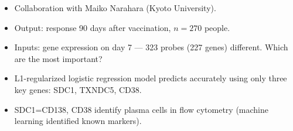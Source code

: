\documentclass{beamer}
\begin{document}
\begin{frame}
{  }

\begin{itemize}
\item Collaboration with Maiko Narahara (Kyoto University).
\item Output: response 90 days after vaccination, $n=270$ people.
\item Inputs: gene expression on day 7 --- 323 probes (227 genes)
  different. Which are the most important?
\item<2> L1-regularized logistic regression model predicts accurately
using only three key genes: SDC1, TXNDC5, CD38.
\item<2> SDC1=CD138, CD38 identify plasma cells in flow cytometry
  (machine learning identified known markers).
\end{itemize}





\end{frame}
\end{document}
